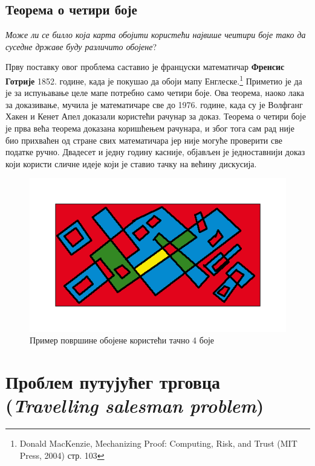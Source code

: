 \documentclass[11pt, oneside, a4paper]{article}
\begin{document}
\subsection{Теорема о четири боје}
\epigraph{\textit{Може ли се билло која карта обојити користећи највише чеитири боје тако да суседне државе буду различито обојене}?}{}

Прву поставку овог проблема саставио је француски математичар \textbf{Френсис Готрије} 1852. године, када је покушао да обоји мапу Енглеске.\footnote{Donald MacKenzie, Mechanizing Proof: Computing, Risk, and Trust (MIT Press, 2004) стр. 103} Приметио је да је за испуњавање целе мапе потребно само четири боје. Ова теорема, наоко лака за доказивање, мучила је математичаре све до 1976. године, када су је Волфганг Хакен и Кенет Апел доказали 
користећи рачунар за доказ. Теорема о четири боје је прва већа теорема доказана коришћењем рачунара, и због тога сам рад није био прихваћен од стране свих математичара јер није могуће проверити све податке ручно. Двадесет и једну годину касније, објављен је једноставнији доказ који користи сличне идеје који је ставио тачку на већину дискусија.

\begin{figure}

    \centering
    \includegraphics[scale=0.6]{download.png}
    \caption{Пример површине обојене користећи тачно 4 боје\footnotemark }
    \label{fig:my_label}

    
\end{figure}

\newpage
\section{Проблем путујућег трговца \\
 (\textit{Travelling salesman problem})}
\setlength{\epigraphwidth}{0.85\textwidth}
\end{document}
